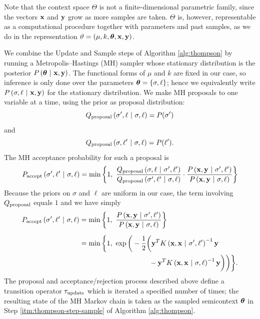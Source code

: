 Note that the context space $\Theta$ is not a finite-dimensional parametric
family, since the vectors $\mathbf{x}$ and $\mathbf{y}$ grow as more samples are
taken.  $\Theta$ is, however, representable as a computational
procedure together with parameters and past samples, as we do in the
representation $\vartheta = (\mu, k, \bm{\theta}, \mathbf{x}, \mathbf{y})$.

We combine the Update and Sample steps of Algorithm \ref{alg:thompson} by
running a Metropolis--Hastings (MH) sampler whose stationary distribution is the
posterior $P\left( \bm{\theta} \ \middle\vert\  \mathbf{x}, \mathbf{y} \right)$.  The functional forms of
$\mu$ and $k$ are fixed in our case, so inference is only done
over the parameters $\bm{\theta} = \left\{ \sigma,\ell \right\}$; hence we equivalently write
$P\left( \sigma,\ell \ \middle\vert\  \mathbf{x}, \mathbf{y} \right)$ for the stationary
distribution.  We make MH proposals to one variable at a time, using the prior
as proposal distribution:
\[
  Q_{\textrm{proposal}}\left( \sigma',\ell \ \middle\vert\  \sigma,\ell \right) = P(\sigma')
\]
and
\[
  Q_{\textrm{proposal}}\left( \sigma,\ell' \ \middle\vert\  \sigma,\ell \right) = P(\ell').
\]
The MH acceptance probability for such a proposal is
\[
  P_{\textrm{accept}}\left( \sigma',\ell' \ \middle\vert\  \sigma,\ell \right)
  =
  \min\left\{ 1,\ \frac{
    Q_{\textrm{proposal}}\left( \sigma,\ell \ \middle\vert\  \sigma',\ell' \right)
    }{
    Q_{\textrm{proposal}}\left( \sigma',\ell' \ \middle\vert\  \sigma,\ell \right)
    }
  \cdot
  \frac{
    P\left( \mathbf{x},\mathbf{y} \ \middle\vert\  \sigma',\ell' \right)
    }{
    P\left( \mathbf{x},\mathbf{y} \ \middle\vert\  \sigma,\ell \right)
    } \right\}
\]
Because the priors on $\sigma$ and $\ell$ are uniform in our case, the term
involving $Q_{\textrm{proposal}}$ equals $1$ and we have simply
\begin{align*}
  P_{\textrm{accept}}\left( \sigma',\ell' \ \middle\vert\  \sigma,\ell \right)
  &=
  \min\left\{ 1,\ \frac{
    P\left( \mathbf{x},\mathbf{y} \ \middle\vert\  \sigma',\ell' \right)
    }{
    P\left( \mathbf{x},\mathbf{y} \ \middle\vert\  \sigma,\ell \right)
    } \right\} \\[2mm]
  &=
  \min\bigg\{1,\ \exp\bigg( -\frac12\bigg(
    \mathbf{y}^T K \left( \mathbf{x}, \mathbf{x} \ \middle\vert\  \sigma', \ell' \right)^{-1} \mathbf{y} \\
  & \qquad\qquad\qquad\qquad\qquad -
    \mathbf{y}^T K \left( \mathbf{x}, \mathbf{x} \ \middle\vert\  \sigma, \ell \right)^{-1} \mathbf{y}
  \bigg)\bigg)\bigg\}.
\end{align*}
The proposal and acceptance/rejection process described above define a
transition operator $\tau_{\textrm{update}}$ which is iterated a specified number of
times; the resulting state of the MH Markov chain is taken as the sampled
semicontext $\bm{\theta}$ in Step \ref{itm:thompson-step-sample} of Algorithm
\ref{alg:thompson}.

